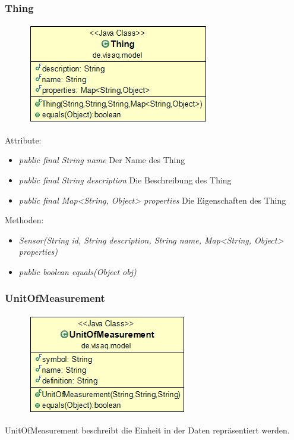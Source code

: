 \subsubsection {Thing}
\begin{minipage}{0.3\textwidth}
	\begin{figure}[H]
		\includegraphics[scale = 0.5
		]{media/frontend/model/Thing_Class.png}
	\end{figure}
\end{minipage} \hfill
\begin{minipage}{0.6\textwidth}
\end{minipage}

Attribute:
\begin{itemize} 
	\item \emph{public final String name} Der Name des Thing
	\item \emph{public final String description} Die Beschreibung des Thing
	\item \emph{public final Map<String, Object> properties} Die Eigenschaften des Thing
\end{itemize}
Methoden:
\begin{itemize} 
	\item \emph{Sensor(String id, String description, String name, Map<String, Object> properties)} 
	\item \emph{public boolean equals(Object obj)} 
\end{itemize}

\subsubsection {UnitOfMeasurement}
\begin{minipage}{0.3\textwidth}
	\begin{figure}[H]
		\includegraphics[scale = 0.5
		]{media/frontend/model/UnitOfMeasurement_Class.png} 
	\end{figure}
\end{minipage} \hfill
\begin{minipage}{0.6\textwidth}
	 UnitOfMeasurement beschreibt die Einheit in der Daten repräsentiert werden.
\end{minipage}

